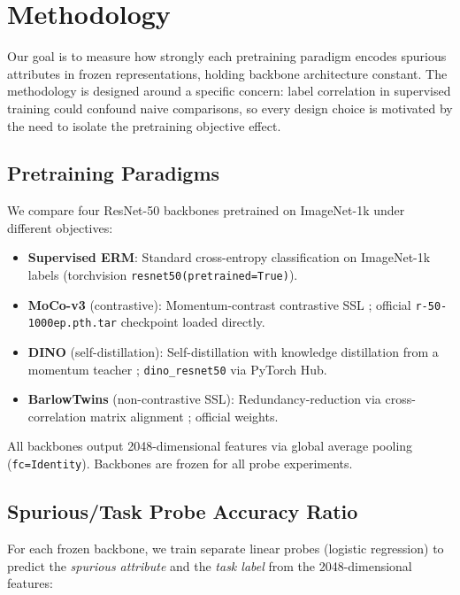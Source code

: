 \section{Methodology}
\label{sec:method}

Our goal is to measure how strongly each pretraining paradigm encodes spurious attributes in frozen representations, holding backbone architecture constant. The methodology is designed around a specific concern: label correlation in supervised training could confound naive comparisons, so every design choice is motivated by the need to isolate the pretraining objective effect.

\subsection{Pretraining Paradigms}

We compare four ResNet-50 backbones pretrained on ImageNet-1k under different objectives:

\begin{itemize}
\item \textbf{Supervised ERM}: Standard cross-entropy classification on ImageNet-1k labels (torchvision \texttt{resnet50(pretrained=True)}).
\item \textbf{MoCo-v3} (contrastive): Momentum-contrast contrastive SSL \citep{He2020MoCo}; official \texttt{r-50-1000ep.pth.tar} checkpoint loaded directly.
\item \textbf{DINO} (self-distillation): Self-distillation with knowledge distillation from a momentum teacher \citep{Caron2021DINO}; \texttt{dino\_resnet50} via PyTorch Hub.
\item \textbf{BarlowTwins} (non-contrastive SSL): Redundancy-reduction via cross-correlation matrix alignment \citep{Zbontar2021BarlowTwins}; official weights.
\end{itemize}

All backbones output 2048-dimensional features via global average pooling (\texttt{fc=Identity}). Backbones are frozen for all probe experiments.

\subsection{Spurious/Task Probe Accuracy Ratio}

For each frozen backbone, we train separate linear probes (logistic regression) to predict the \textit{spurious attribute} and the \textit{task label} from the 2048-dimensional features:

